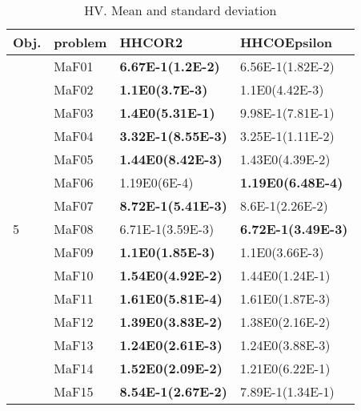 \documentclass[]{article}
\begin{document}
\begin{table}
\caption{HV. Mean and standard deviation}
\label{table:mean.HV}
\centering
\begin{footnotesize}
\begin{tabular}{|l|l|l|l|}
\hline
Obj. & problem  & HHCOR2 & HHCOEpsilon \\ \hline

\multirow{15}{*}{5} & MaF01 & \cellcolor{gray95} {\bf 6.67E-1(1.2E-2)} & 6.56E-1(1.82E-2)\\
 & MaF02 & \cellcolor{gray95} {\bf 1.1E0(3.7E-3)} & \cellcolor{gray95} 1.1E0(4.42E-3)\\
 & MaF03 & \cellcolor{gray95} {\bf 1.4E0(5.31E-1)} & 9.98E-1(7.81E-1)\\
 & MaF04 & \cellcolor{gray95} {\bf 3.32E-1(8.55E-3)} & 3.25E-1(1.11E-2)\\
 & MaF05 & \cellcolor{gray95} {\bf 1.44E0(8.42E-3)} & \cellcolor{gray95} 1.43E0(4.39E-2)\\
 & MaF06 & \cellcolor{gray95} 1.19E0(6E-4) & \cellcolor{gray95} {\bf 1.19E0(6.48E-4)}\\
 & MaF07 & \cellcolor{gray95} {\bf 8.72E-1(5.41E-3)} & \cellcolor{gray95} 8.6E-1(2.26E-2)\\
 & MaF08 & \cellcolor{gray95} 6.71E-1(3.59E-3) & \cellcolor{gray95} {\bf 6.72E-1(3.49E-3)}\\
 & MaF09 & \cellcolor{gray95} {\bf 1.1E0(1.85E-3)} & \cellcolor{gray95} 1.1E0(3.66E-3)\\
 & MaF10 & \cellcolor{gray95} {\bf 1.54E0(4.92E-2)} & 1.44E0(1.24E-1)\\
 & MaF11 & \cellcolor{gray95} {\bf 1.61E0(5.81E-4)} & 1.61E0(1.87E-3)\\
 & MaF12 & \cellcolor{gray95} {\bf 1.39E0(3.83E-2)} & \cellcolor{gray95} 1.38E0(2.16E-2)\\
 & MaF13 & \cellcolor{gray95} {\bf 1.24E0(2.61E-3)} & \cellcolor{gray95} 1.24E0(3.88E-3)\\
 & MaF14 & \cellcolor{gray95} {\bf 1.52E0(2.09E-2)} & \cellcolor{gray95} 1.21E0(6.22E-1)\\
 & MaF15 & \cellcolor{gray95} {\bf 8.54E-1(2.67E-2)} & 7.89E-1(1.34E-1)\\
\hline


\end{tabular}
\end{footnotesize}
\end{table}
\end{document}
